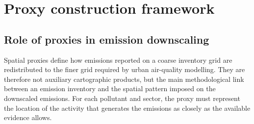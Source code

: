 \section{Proxy construction framework}
\label{sec:framework}

\subsection{Role of proxies in emission downscaling}

Spatial proxies define how emissions reported on a coarse inventory grid
are redistributed to the finer grid required by urban air-quality
modelling. They are therefore not auxiliary cartographic products, but
the main methodological link between an emission inventory and the
spatial pattern imposed on the downscaled emissions. For each pollutant
and sector, the proxy must represent the location of the activity that
generates the emissions as closely as the available evidence allows.

